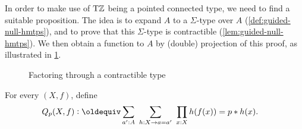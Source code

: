 \documentclass[a4,12pt]{amsart}
\begin{document}
In order to make use of ${\mathrm{T}\mathbb{Z}}$ being a pointed connected type, 
we need to find a suitable proposition.
The idea is to expand $A$ to a $\Sigma$-type over $A$
(\cref{def:guided-null-hmtps}), 
and to prove that this $\Sigma$-type is contractible
(\cref{lem:guided-null-hmtps}).
We then obtain a function to $A$ by (double) projection
of this proof, as illustrated in \cref{fig:TorZ-recursion}.

\begin{figure}
\caption{\label{fig:TorZ-recursion}Factoring through a contractible type}
\end{figure}

\begin{definition}\label{def:guided-null-hmtps}
For every $(X,f)$, define
\begin{align*}\label{eq:TBD}
Q_p(X,f)&\defeq \sum_{a':A}~\sum_{h:X\to a=a'}~\prod_{x:X} h(f(x))=p\ct h(x).
\end{align*}
\end{definition}
\end{document}
